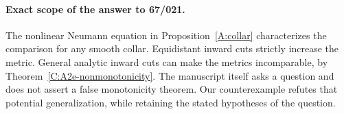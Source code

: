 \paragraph{Exact scope of the answer to 67/021.}
The nonlinear Neumann equation in Proposition~\ref{A:collar} characterizes the comparison for any smooth collar. Equidistant inward cuts strictly increase the metric. General analytic inward cuts can make the metrics incomparable, by Theorem~\ref{C:A2e-nonmonotonicity}. The manuscript itself asks a question and does not assert a false monotonicity theorem. Our counterexample refutes that potential generalization, while retaining the stated hypotheses of the question.
